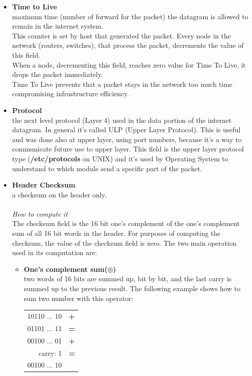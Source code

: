 \begin{itemize}
{The fragment offset is measured in units of 8 octets (64 bits).  The first fragment has offset zero.\\ It's computed starting from initial position in the packet.
}
\item{\textbf{Time to Live}\\
maximum time (number of forward for the packet) the datagram is allowed to remain in the internet system.\\
This counter is set by host that generated the packet. Every node in the network (routers, switches), that process the packet, decrements the value of this field.\\
When a node, decrementing this field, reaches zero value for Time To Live, it drops the packet immediately.\\
Time To Live prevents that a packet stays in the network too much time compromising infrustructure efficiency.
}
\item{\textbf{Protocol}\\
the next level protocol (Layer 4) used in the data portion of the internet datagram. In general it's called ULP (Upper Layer Protocol). This is useful and was done also at upper layer, using port numbers, because it's a way to communicate future use to upper layer. This field is the upper layer protocol type (\textbf{/etc/protocols} on UNIX) and it's used by Operating System to understand to which module send a specific part of the packet.
}
\item{\textbf{Header Checksum}\\
a checksum on the header only.\\\\
\textit{How to compute it}\\
The checksum field is the 16 bit one's complement of the one's complement sum of all 16 bit words in the header.  For purposes of computing the checksum, the value of the checksum field is zero. The two main operation used in its computation are:
\begin{itemize}
\item{\textbf{One's complement sum(}$\oplus$\textbf{)}\\
two words of 16 bits are summed up, bit by bit, and the last carry is summed up to the previous result. The following example shows how to sum two number with this operator:
\begin{table}[h]
\centering\footnotesize
\begin{tabular}{rl}
{10110 ... 10} & {\textbf{+}}\\
{01101 ... 11} & {\textbf{=}}\\
\hline
{00100 ... 01} & {\textbf{+}}\\
{carry: 1} & {\textbf{=}}\\
\hline
{00100 ... 10} &\\
\end{tabular}
\end{table}
}


\end{itemize}}
\end{itemize}
